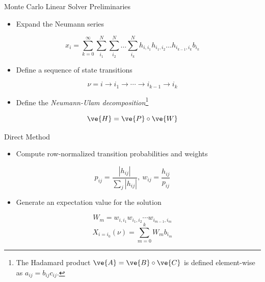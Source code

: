 \documentclass{beamer}
\begin{document}
\begin{frame}{Monte Carlo Linear Solver Preliminaries}

  \begin{itemize}
  \item Expand the Neumann series
  \end{itemize}

  \[
  x_i = \sum_{k=0}^{\infty}\sum_{i_1}^{N}\sum_{i_2}^{N}\ldots
  \sum_{i_k}^{N}h_{i,i_1}h_{i_1,i_2}\ldots h_{i_{k-1},i_k}b_{i_k}
  \]

  \begin{itemize}
  \item Define a sequence of state transitions
  \end{itemize}
  
  \[
  \nu = i \rightarrow i_1 \rightarrow \cdots \rightarrow i_{k-1}
  \rightarrow i_{k}
  \]

  \medskip
  \begin{itemize}
  \item Define the \textit{Neumann-Ulam decomposition}\footnote{The
    Hadamard product $\ve{A} = \ve{B} \circ \ve{C}$ is defined
    element-wise as $a_{ij} = b_{ij} c_{ij}$.}
  \end{itemize}

  \[
  \ve{H} = \ve{P} \circ \ve{W}
  \]

\end{frame}

\begin{frame}{Direct Method}

  \begin{itemize}
  \item Compute row-normalized transition probabilities and weights
  \end{itemize}

  \[
  p_{ij} = \frac{|h_{ij}|}{\sum_j |h_{ij}|},\ w_{ij} =
  \frac{h_{ij}}{p_{ij}}
  \]

  \medskip \medskip
  \begin{itemize}
  \item Generate an expectation value for the solution
  \end{itemize}

  \[
  W_{m} = w_{i,i_1} w_{i_1,i_2} \cdots w_{i_{m-1},i_m}
  \]
  \[
  X_{i=i_0}(\nu) = \sum_{m=0}^k W_{m} b_{i_m}
  \]
\end{frame}
\end{document}
